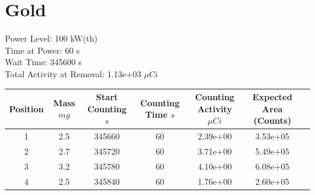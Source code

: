 \newpage

\section*{ Gold }

Power Level: 100 kW(th) \\
Time at Power: 60 s \\
Wait Time: 345600 s \\
Total Activity at Removal: 1.13e+03 $\mu Ci$

\begin{table}[h]
\centering
\begin{tabular}{ |c|c|c|c|c|c|c| }
 \hline
 Position & Mass $mg$ & Start Counting $s$ & Counting Time $s$ & Counting Activity $\mu Ci$ & Expected Area (Counts) \\
 \hline 
 1 & 2.5 & 345660 & 60 & 2.39e+00 & 3.53e+05\\ 
\hline
 2 & 2.7 & 345720 & 60 & 3.71e+00 & 5.49e+05\\ 
\hline
 3 & 3.2 & 345780 & 60 & 4.10e+00 & 6.08e+05\\ 
\hline
 4 & 2.5 & 345840 & 60 & 1.76e+00 & 2.60e+05\\ 
\hline
\end{tabular}
\end{table}

